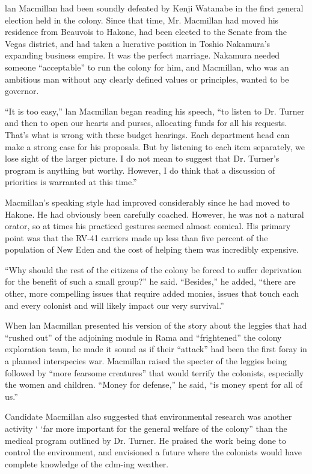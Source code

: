 \documentclass[]{article}
\begin{document}
{lan Macmillan had been soundly defeated by Kenji Watanabe in the first general election held in the colony.  Since that time, Mr.  Macmillan had moved his residence from Beauvois to Hakone, had been elected to the Senate from the Vegas district, and had taken a lucrative position in Toshio Nakamura’s expanding business empire.  It was the perfect marriage.  Nakamura needed someone “acceptable” to run the colony for him, and Macmillan, who was an ambitious man without any clearly defined values or principles, wanted to be governor.

“It is too easy,” lan Macmillan began reading his speech, “to listen to Dr.  Turner and then to open our hearts and purses, allocating funds for all his requests.  That’s what is wrong with these budget hearings.  Each department head can make a strong case for his proposals.  But by listening to each item separately, we lose sight of the larger picture.  I do not mean to suggest that Dr.  Turner’s program is anything but worthy.  However, I do think that a discussion of priorities is warranted at this time.”

Macmillan’s speaking style had improved considerably since he had moved to Hakone.  He had obviously been carefully coached.  However, he was not a natural orator, so at times his practiced gestures seemed almost comical.  His primary point was that the RV-41 carriers made up less than five percent of the population of New Eden and the cost of helping them was incredibly expensive.

“Why should the rest of the citizens of the colony be forced to suffer deprivation for the benefit of such a small group?” he said.  “Besides,” he added, “there are other, more compelling issues that require added monies, issues that touch each and every colonist and will likely impact our very survival.”

When lan Macmillan presented his version of the story about the leggies that had “rushed out” of the adjoining module in Rama and “frightened” the colony exploration team, he made it sound as if their “attack” had been the first foray in a planned interspecies war.  Macmillan raised the specter of the leggies being followed by “more fearsome creatures” that would terrify the colonists, especially the women and children.  “Money for defense,” he said, “is money spent for all of us.”

Candidate Macmillan also suggested that environmental research was another activity ‘ ‘far more important for the general welfare of the colony” than the medical program outlined by Dr.  Turner.  He praised the work being done to control the environment, and envisioned a future where the colonists would have complete knowledge of the cdm-ing weather.

}
\end{document}
